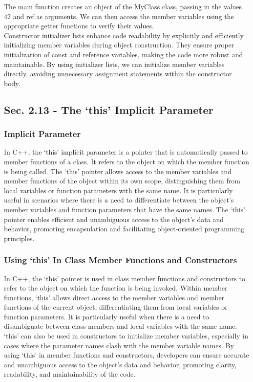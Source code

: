 \begin{solution}
    \noindent The main function creates an object of the MyClass class, passing in the values 42 and ref as arguments. We can then access the member variables using the appropriate getter functions to verify their values. \\

    \noindent Constructor initializer lists enhance code readability by explicitly and efficiently initializing member variables during object construction. They ensure proper initialization of const and reference variables, making the code more robust and maintainable. By using initializer lists, 
    we can initialize member variables directly, avoiding unnecessary assignment statements within the constructor body. \\
\end{solution}

\subsection*{Sec. 2.13 - The `this' Implicit Parameter}
\subsubsection*{Implicit Parameter}

In C++, the `this' implicit parameter is a pointer that is automatically passed to member functions of a class. It refers to the object on which the member function is being called. The `this' pointer allows access to the member variables and member functions of the object within its own scope, 
distinguishing them from local variables or function parameters with the same name. It is particularly useful in scenarios where there is a need to differentiate between the object's member variables and function parameters that have the same names. The `this' pointer enables efficient and unambiguous 
access to the object's data and behavior, promoting encapsulation and facilitating object-oriented programming principles. \\

\subsubsection*{Using `this' In Class Member Functions and Constructors}

In C++, the `this' pointer is used in class member functions and constructors to refer to the object on which the function is being invoked. Within member functions, `this' allows direct access to the member variables and member functions of the current object, differentiating them from local variables 
or function parameters. It is particularly useful when there is a need to disambiguate between class members and local variables with the same name. `this' can also be used in constructors to initialize member variables, especially in cases where the parameter names clash with the member variable names. 
By using `this' in member functions and constructors, developers can ensure accurate and unambiguous access to the object's data and behavior, promoting clarity, readability, and maintainability of the code. \\

